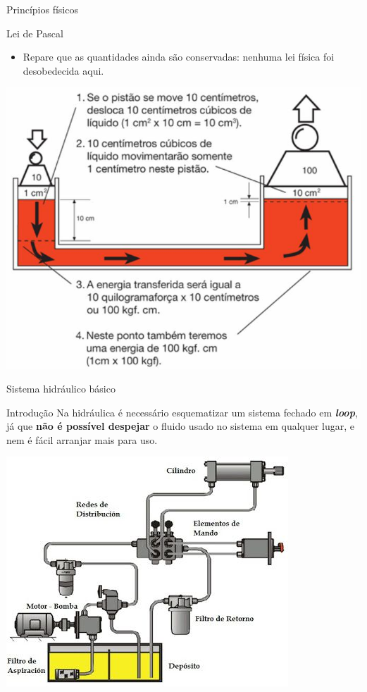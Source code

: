 \begin{frame}{Princípios físicos}
	\begin{block}{Lei de Pascal}
		\begin{itemize}
			\item Repare que as quantidades ainda são conservadas: nenhuma lei física foi desobedecida aqui.
		\end{itemize}
	\end{block}
	
	\centering
	\includegraphics[width=0.6\linewidth]{Figuras/Ch15/fig4}
	
\end{frame}


\begin{frame}{Sistema hidráulico básico}
	\begin{block}{Introdução}
		Na hidráulica é necessário esquematizar um sistema fechado em \textbf{\textit{loop}}, já que \textbf{não é possível despejar} o fluido usado no sistema em qualquer lugar, e nem é fácil arranjar mais para uso.
	\end{block}
	
	\medskip
	\centering
	
	\includegraphics[width=0.5\linewidth]{Figuras/Ch15/fig5n2}
	
\end{frame}


